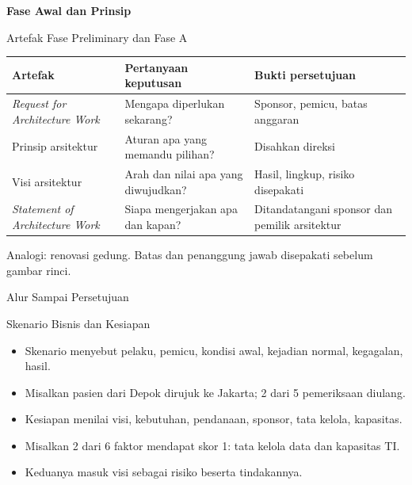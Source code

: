 \documentclass[aspectratio=169, table, 12pt]{beamer}
\begin{document}
\begin{frame}{\hfill}
  \centering
  \Huge{\textbf{Fase Awal dan Prinsip}}
\end{frame}

\begin{frame}{{\Large Artefak Fase Preliminary dan Fase A}}
  \footnotesize
  \begin{tabularx}{\textwidth}{>{\raggedright\arraybackslash}p{3.6cm}
      >{\raggedright\arraybackslash}X >{\raggedright\arraybackslash}X}
    \hline
    \textbf{Artefak} & \textbf{Pertanyaan keputusan} & \textbf{Bukti persetujuan} \\
    \hline
    \textit{Request for Architecture Work} & Mengapa diperlukan sekarang? & Sponsor, pemicu, batas anggaran \\
    \hline
    Prinsip arsitektur & Aturan apa yang memandu pilihan? & Disahkan direksi \\
    \hline
    Visi arsitektur & Arah dan nilai apa yang diwujudkan? & Hasil, lingkup, risiko disepakati \\
    \hline
    \textit{Statement of Architecture Work} & Siapa mengerjakan apa dan kapan? & Ditandatangani sponsor dan pemilik arsitektur \\
    \hline
  \end{tabularx}

  \vspace{6pt}
  {\small Analogi: renovasi gedung. Batas dan penanggung jawab disepakati sebelum gambar rinci.}
\end{frame}

\begin{frame}{{\Large Alur Sampai Persetujuan}}
  \centering
\end{frame}

\begin{frame}{{\Large Skenario Bisnis dan Kesiapan}}
  \vspace{10pt}
  \begin{itemize}
    \item Skenario menyebut pelaku, pemicu, kondisi awal, kejadian normal, kegagalan, hasil.
    \item Misalkan pasien dari Depok dirujuk ke Jakarta; 2 dari 5 pemeriksaan diulang.
    \item Kesiapan menilai visi, kebutuhan, pendanaan, sponsor, tata kelola, kapasitas.
    \item Misalkan 2 dari 6 faktor mendapat skor 1: tata kelola data dan kapasitas TI.
    \item Keduanya masuk visi sebagai risiko beserta tindakannya.
  \end{itemize}
\end{frame}
\end{document}

